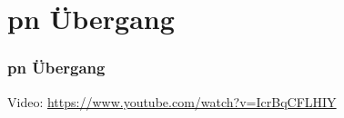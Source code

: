 

\section*{pn Übergang}

\begin{frame}
    \frametitle{pn Übergang}
    \begin{center}
Video: \url{https://www.youtube.com/watch?v=IcrBqCFLHIY}
	\end{center}
\end{frame}

